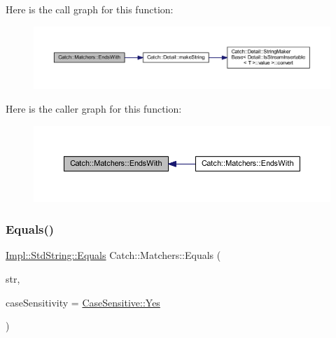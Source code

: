 Here is the call graph for this function\+:\nopagebreak
\begin{figure}[H]
\begin{center}
\leavevmode
\includegraphics[width=350pt]{namespace_catch_1_1_matchers_ae3e6d8f7fea6fac6513596b23e5d5153_cgraph}
\end{center}
\end{figure}
Here is the caller graph for this function\+:\nopagebreak
\begin{figure}[H]
\begin{center}
\leavevmode
\includegraphics[width=350pt]{namespace_catch_1_1_matchers_ae3e6d8f7fea6fac6513596b23e5d5153_icgraph}
\end{center}
\end{figure}
\hypertarget{namespace_catch_1_1_matchers_a840317a3d0f828642c2f55155068bb97}{}\label{namespace_catch_1_1_matchers_a840317a3d0f828642c2f55155068bb97} 
\subsubsection{\texorpdfstring{Equals()}{Equals()}\hspace{0.1cm}{\footnotesize\ttfamily [1/2]}}
{\footnotesize\ttfamily \hyperlink{struct_catch_1_1_matchers_1_1_impl_1_1_std_string_1_1_equals}{Impl\+::\+Std\+String\+::\+Equals} Catch\+::\+Matchers\+::\+Equals (\begin{DoxyParamCaption}\item[{std\+::string const \&}]{str,  }\item[{\hyperlink{struct_catch_1_1_case_sensitive_aad49d3aee2d97066642fffa919685c6a}{Case\+Sensitive\+::\+Choice}}]{case\+Sensitivity = {\ttfamily \hyperlink{struct_catch_1_1_case_sensitive_aad49d3aee2d97066642fffa919685c6aa7c5550b69ec3c502e6f609b67f9613c6}{Case\+Sensitive\+::\+Yes}} }\end{DoxyParamCaption})\hspace{0.3cm}{\ttfamily [inline]}}

